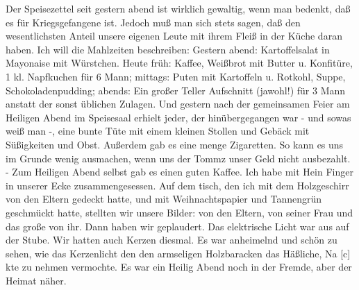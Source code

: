 \def\day{25. Dezember 1943.}
\mktitle

Der Speisezettel seit gestern abend ist wirklich gewaltig, wenn man bedenkt, da{\ss} es f\"{u}r Kriegsgefangene ist.
Jedoch mu{\ss} man sich stets sagen, da{\ss} den wesentlichsten Anteil unsere eigenen Leute mit ihrem Flei{\ss} in der K\"{u}che daran haben.
Ich will die Mahlzeiten beschreiben: Gestern abend: Kartoffelsalat in Mayonaise mit W\"{u}rstchen.
Heute fr\"{u}h: Kaffee, Wei{\ss}brot mit Butter u. Konfit\"{u}re, 1 kl. Napfkuchen f\"{u}r 6 Mann; mittags: Puten mit Kartoffeln u. Rotkohl, Suppe, Schokoladenpudding; abends: Ein gro{\ss}er Teller Aufschnitt (jawohl!) f\"{u}r 3 Mann anstatt der sonst \"{u}blichen Zulagen.
Und gestern nach der gemeinsamen Feier am Heiligen Abend im Speisesaal erhielt jeder, der hin\"{u}bergegangen war - und sowas wei{\ss} man -, eine bunte T\"{u}te mit einem kleinen Stollen und Geb\"{a}ck mit S\"{u}{\ss}igkeiten und Obst.
Au{\ss}erdem gab es eine menge Zigaretten.
So kann es uns im Grunde wenig ausmachen, wenn uns der Tommz unser Geld nicht ausbezahlt. -
Zum Heiligen Abend selbst gab es einen guten Kaffee.
Ich habe mit Hein Finger in unserer Ecke zusammengesessen.
Auf dem tisch, den ich mit dem Holzgeschirr von den Eltern gedeckt hatte, und mit Weihnachtspapier und Tannengr\"{u}n geschm\"{u}ckt hatte, stellten wir unsere Bilder: von den Eltern, von seiner Frau und das gro{\ss}e von ihr.
Dann haben wir geplaudert.
Das elektrische Licht war aus auf der Stube.
Wir hatten auch Kerzen diesmal.
Es war anheimelnd und sch\"{o}n zu sehen, wie das Kerzenlicht den den armseligen Holzbaracken das H\"{a}{\ss}liche, Na{\color{red} [c] }kte zu nehmen vermochte.
Es war ein Heilig Abend noch in der Fremde, aber der Heimat n\"{a}her.

\clearpage
